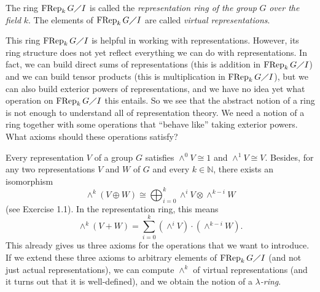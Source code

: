 \documentclass[numbers=enddot,12pt,final,onecolumn,notitlepage]{scrartcl}%
\begin{document}
The ring $\operatorname*{FRep}_{k}G\diagup I$ is called the
\textit{representation ring of the group }$G$\textit{ over the field }$k$. The
elements of $\operatorname*{FRep}_{k}G\diagup I$ are called \textit{virtual
representations}.

This ring $\operatorname*{FRep}_{k}G\diagup I$ is helpful in working with
representations. However, its ring structure does not yet reflect everything
we can do with representations. In fact, we can build direct sums of
representations (this is addition in $\operatorname*{FRep}_{k}G\diagup I$) and
we can build tensor products (this is multiplication in $\operatorname*{FRep}%
_{k}G\diagup I$), but we can also build exterior powers of representations,
and we have no idea yet what operation on $\operatorname*{FRep}_{k}G\diagup I$
this entails. So we see that the abstract notion of a ring is not enough to
understand all of representation theory. We need a notion of a ring together
with some operations that ``behave like'' taking exterior powers. What axioms
should these operations satisfy?

Every representation $V$ of a group $G$ satisfies $\wedge^{0}V\cong1$ and
$\wedge^{1}V\cong V$. Besides, for any two representations $V$ and $W$ of $G$
and every $k\in\mathbb{N}$, there exists an isomorphism%
\begin{equation}
\wedge^{k}\left(  V\oplus W\right)  \cong\bigoplus_{i=0}^{k}\wedge^{i}%
V\otimes\wedge^{k-i}W \label{RepThV+W}%
\end{equation}
(see Exercise 1.1). In the representation ring, this means%
\[
\wedge^{k}\left(  V+W\right)  =\sum_{i=0}^{k}\left(  \wedge^{i}V\right)
\cdot\left(  \wedge^{k-i}W\right)  .
\]
This already gives us three axioms for the operations that we want to
introduce. If we extend these three axioms to arbitrary elements of
$\operatorname*{FRep}_{k}G\diagup I$ (and not just actual representations), we
can compute $\wedge^{k}$ of virtual representations (and it turns out that it
is well-defined), and we obtain the notion of a $\lambda$\textit{-ring}.
\end{document}

